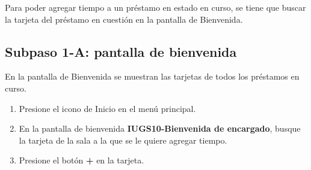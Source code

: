 Para poder agregar tiempo a un préstamo en estado en curso, se tiene 
que buscar la tarjeta del préstamo en cuestión en la pantalla de 
Bienvenida.

\subsection{Subpaso 1-A: pantalla de bienvenida}
En la pantalla de Bienvenida se muestran las tarjetas de todos los 
préstamos en curso.
\begin{enumerate}
    \item Presione el icono de Inicio en el menú principal.
    \item En la pantalla de bienvenida \textbf{IUGS10-Bienvenida 
        de encargado}, busque la tarjeta de la sala a la que se 
        le quiere agregar tiempo.
    \item Presione el botón \textbf{+} en la tarjeta.
\end{enumerate}

